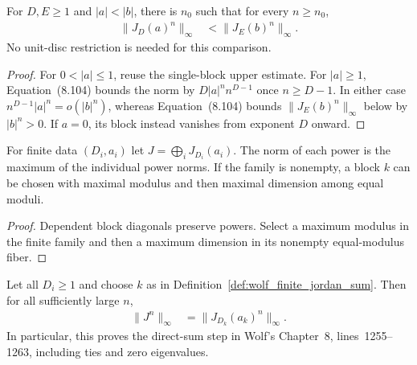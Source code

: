 \begin{theorem}
    \label{thm:wolf_jordan_eventual_strict_comparison}
    \leanok
    For $D,E\ge1$ and $|a|<|b|$, there is $n_0$ such that for every
    $n\ge n_0$,
    \begin{align}
      \lVert J_D(a)^n\rVert_\infty
        &<\lVert J_E(b)^n\rVert_\infty.
    \end{align}
    No unit-disc restriction is needed for this comparison.
\end{theorem}

\begin{proof}
    \leanok
    For $0<|a|\le1$, reuse the single-block upper estimate. For $|a|\ge1$,
    Equation~(8.104) bounds the norm by $D|a|^n n^{D-1}$ once $n\ge D-1$.
    In either case $n^{D-1}|a|^n=o(|b|^n)$, whereas Equation~(8.104)
    bounds $\lVert J_E(b)^n\rVert_\infty$ below by $|b|^n>0$.
    If $a=0$, its block instead vanishes from exponent $D$ onward.
\end{proof}

\begin{definition}
    \label{def:wolf_finite_jordan_sum}
    \leanok
    For finite data $(D_i,a_i)$ let $J=\bigoplus_i J_{D_i}(a_i)$.
    The norm of each power is the maximum of the individual power norms.
    If the family is nonempty, a block $k$ can be chosen with maximal
    modulus and then maximal dimension among equal moduli.
\end{definition}

\begin{proof}
    \leanok
    Dependent block diagonals preserve powers. Select a maximum modulus
    in the finite family and then a maximum dimension in its nonempty
    equal-modulus fiber.
\end{proof}

\begin{theorem}
    \label{thm:wolf_finite_jordan_sum_eventual_maximum}
    \leanok
    Let all $D_i\ge1$ and choose $k$ as in
    Definition~\ref{def:wolf_finite_jordan_sum}. Then for all sufficiently
    large $n$,
    \begin{align}
      \lVert J^n\rVert_\infty&=\lVert J_{D_k}(a_k)^n\rVert_\infty.
    \end{align}
    In particular, this proves the direct-sum step in Wolf's Chapter~8,
    lines~1255--1263, including ties and zero eigenvalues.
\end{theorem}

